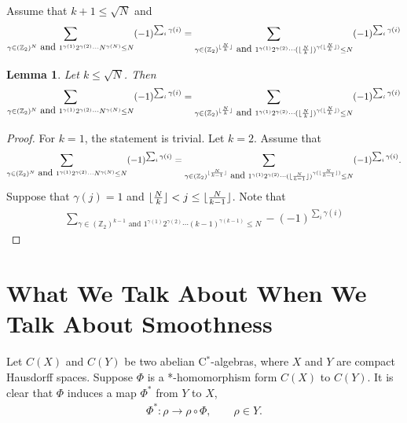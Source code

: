 \documentclass[a4paper,10pt]{amsart}
\newtheorem{lemma}{Lemma}[section]
\newcommand{\Z}{\mathbb Z} %
\DeclarePairedDelimiter\floor{\lfloor}{\rfloor}
\begin{document}
Assume that $k + 1 \leq \sqrt{N}$ and 
\begin{align*}
    \sum_{\gamma \in (\Z_{2})^{N} \mbox{ and } 
    1^{\gamma(1)}2^{\gamma(2)}\cdots N^{\gamma(N)} \leq N} 
    (-1)^{\sum_{i}\gamma(i)} 
    = \sum_{\gamma \in (\Z_{2})^{\floor{\frac{N}{k}}} \mbox{ and } 
    1^{\gamma(1)}2^{\gamma(2)}\cdots 
    (\floor{\frac{N}{k}})^{\gamma(\floor{\frac{N}{k}})} \leq N} 
    (-1)^{\sum_{i}\gamma(i)}
\end{align*}

\begin{lemma}
    Let $k \leq \sqrt{N}$. Then
    \begin{align*}
    \sum_{\gamma \in (\Z_{2})^{N} \mbox{ and } 
    1^{\gamma(1)}2^{\gamma(2)}\cdots N^{\gamma(N)} \leq N} 
    (-1)^{\sum_{i}\gamma(i)} 
    = \sum_{\gamma \in (\Z_{2})^{\floor{\frac{N}{k}}} \mbox{ and } 
    1^{\gamma(1)}2^{\gamma(2)}\cdots 
    (\floor{\frac{N}{k}})^{\gamma(\floor{\frac{N}{k}})} \leq N} 
    (-1)^{\sum_{i}\gamma(i)}
\end{align*}
\end{lemma}

\begin{proof}
   For $k = 1$, the statement is trivial. Let $k = 2$. 
       Assume that
    \begin{align*}
    \sum_{\gamma \in (\Z_{2})^{N} \mbox{ and } 
    1^{\gamma(1)}2^{\gamma(2)}\cdots N^{\gamma(N)} \leq N} 
    (-1)^{\sum_{i}\gamma(i)} 
    = \sum_{\gamma \in (\Z_{2})^{\floor{\frac{N}{k-1}}} \mbox{ and } 
    1^{\gamma(1)}2^{\gamma(2)}\cdots 
    (\floor{\frac{N}{k-1}})^{\gamma(\floor{\frac{N}{k-1}})} \leq N} 
    (-1)^{\sum_{i}\gamma(i)}.
\end{align*}
Suppose that $\gamma(j) = 1$ and 
$\floor{\frac{N}{k}} < j \leq \floor{\frac{N}{k-1}}$.
Note that
\begin{align*}
    \sum_{\gamma \in (\Z_{2})^{k-1} \mbox{ and } 
    1^{\gamma(1)}2^{\gamma(2)}\cdots (k-1)^{\gamma(k-1)} \leq N} 
    -(-1)^{\sum_{i}\gamma(i)} 
\end{align*}

\end{proof}

\section{What We Talk About When We Talk About Smoothness} 

Let $C(X)$ and $C(Y)$ be two abelian C$^*$-algebras, where
$X$ and $Y$ are compact Hausdorff spaces. Suppose $\varPhi$ 
is a *-homomorphism form $C(X)$ to $C(Y)$. It is clear that
$\varPhi$ induces a map $\varPhi^{*}$ from $Y$ to $X$,
\begin{align*}
    \varPhi^{*}: \rho \rightarrow \rho \circ \varPhi, \qquad
    \rho \in Y.
\end{align*}
\end{document}
